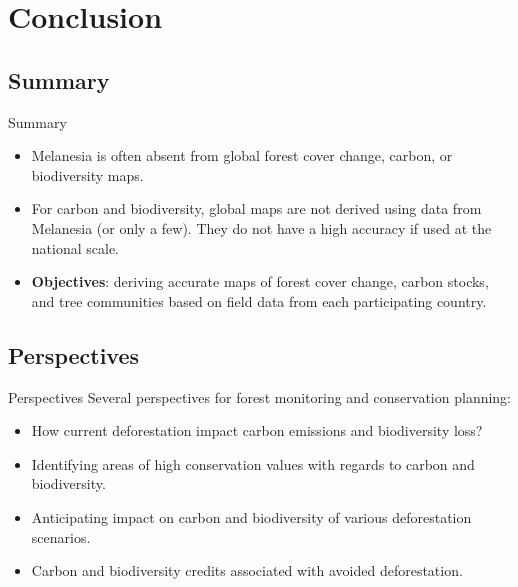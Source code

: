 \documentclass[10pt,table,dvipsnames,compress]{beamer}
\begin{document}
\section{Conclusion}
\label{sec:org3b8bc61}

\subsection{Summary}
\label{sec:orgffba79e}

\begin{frame}[label={sec:orge9e2e03}]{Summary}
\begin{itemize}
\item Melanesia is often absent from global forest cover change, carbon, or biodiversity maps.
\item For carbon and biodiversity, global maps are not derived using data from Melanesia (or only a few). They do not have a high accuracy if used at the national scale.
\item \textbf{Objectives}: deriving accurate maps of forest cover change, carbon stocks, and tree communities based on field data from each participating country.
\end{itemize}
\end{frame}

\subsection{Perspectives}
\label{sec:org3bdc486}

\begin{frame}[label={sec:org8b1a252}]{Perspectives}
Several perspectives for forest monitoring and conservation planning:
\begin{itemize}
\item How current deforestation impact carbon emissions and biodiversity loss?
\item Identifying areas of high conservation values with regards to carbon and biodiversity.
\item Anticipating impact on carbon and biodiversity of various deforestation scenarios.
\item Carbon and biodiversity credits associated with avoided deforestation.
\end{itemize}
\end{frame}

\end{document}
